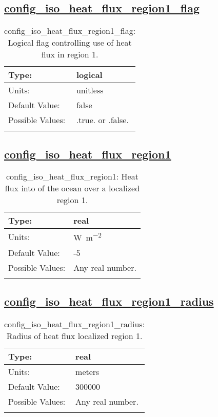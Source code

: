 \subsection[config\_iso\_heat\_flux\_region1\_flag]{\hyperref[sec:nm_tab_iso]{config\_iso\_heat\_flux\_region1\_flag}}
\label{subsec:nm_sec_config_iso_heat_flux_region1_flag}
\begin{center}
\begin{longtable}{| p{2.0in} || p{4.0in} |}
    \hline
    Type: & logical \\
    \hline
    Units: & \si{unitless} \\
    \hline
    Default Value: & false \\
    \hline
    Possible Values: & .true. or .false. \\
    \hline
    \caption{config\_iso\_heat\_flux\_region1\_flag: Logical flag controlling use of heat flux in region 1.}
\end{longtable}
\end{center}
\subsection[config\_iso\_heat\_flux\_region1]{\hyperref[sec:nm_tab_iso]{config\_iso\_heat\_flux\_region1}}
\label{subsec:nm_sec_config_iso_heat_flux_region1}
\begin{center}
\begin{longtable}{| p{2.0in} || p{4.0in} |}
    \hline
    Type: & real \\
    \hline
    Units: & \si{W.m^{-2}} \\
    \hline
    Default Value: & -5 \\
    \hline
    Possible Values: & Any real number. \\
    \hline
    \caption{config\_iso\_heat\_flux\_region1: Heat flux into of the ocean over a localized region 1.}
\end{longtable}
\end{center}
\subsection[config\_iso\_heat\_flux\_region1\_radius]{\hyperref[sec:nm_tab_iso]{config\_iso\_heat\_flux\_region1\_radius}}
\label{subsec:nm_sec_config_iso_heat_flux_region1_radius}
\begin{center}
\begin{longtable}{| p{2.0in} || p{4.0in} |}
    \hline
    Type: & real \\
    \hline
    Units: & \si{meters} \\
    \hline
    Default Value: & 300000 \\
    \hline
    Possible Values: & Any real number. \\
    \hline
    \caption{config\_iso\_heat\_flux\_region1\_radius: Radius of heat flux localized region 1.}
\end{longtable}
\end{center}
